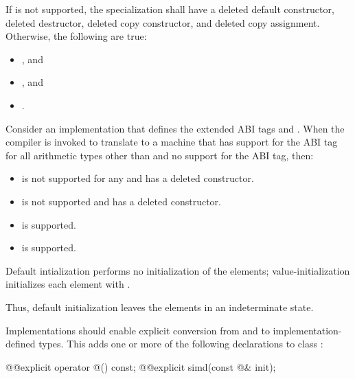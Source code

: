 If  is not supported, the specialization shall have a deleted default constructor, deleted destructor, deleted copy constructor, and deleted copy assignment.
Otherwise, the following are true:
\begin{itemize}
  \item {}, and
  \item {}, and
  \item {}.
\end{itemize}

\begin{example}
  Consider an implementation that defines the extended ABI tags  and . When the compiler is invoked to translate to a machine that has support for the  ABI tag for all arithmetic types other than  and no support for the  ABI tag, then:
  \begin{itemize}
    \item {} is not supported for any  and has a deleted constructor.
    \item {} is not supported and has a deleted constructor.
    \item {} is supported.
    \item {} is supported.
  \end{itemize}
\end{example}

\pnum
Default intialization performs no initialization of the elements; value-initialization initializes each element with . \begin{note}Thus, default initialization leaves the elements in an indeterminate state.\end{note}

\pnum
Implementations should enable explicit conversion from and to implementation-defined types. This adds one or more of the following declarations to class :

\begin{codeblock}
@@explicit operator @\impdef@() const;
@@explicit simd(const @\impdef@& init);
\end{codeblock}

